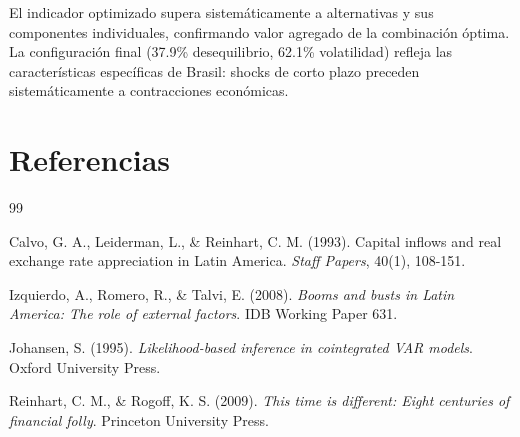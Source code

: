 \documentclass[3p,11pt]{elsarticle}
\begin{document}
El indicador optimizado supera sistemáticamente a alternativas y sus componentes individuales, confirmando valor agregado de la combinación óptima. La configuración final (37.9\% desequilibrio, 62.1\% volatilidad) refleja las características específicas de Brasil: shocks de corto plazo preceden sistemáticamente a contracciones económicas.

\section*{Referencias}

\begin{thebibliography}{99}

Calvo, G. A., Leiderman, L., \& Reinhart, C. M. (1993). Capital inflows and real exchange rate appreciation in Latin America. \textit{Staff Papers}, 40(1), 108-151.

Izquierdo, A., Romero, R., \& Talvi, E. (2008). \textit{Booms and busts in Latin America: The role of external factors}. IDB Working Paper 631.

Johansen, S. (1995). \textit{Likelihood-based inference in cointegrated VAR models}. Oxford University Press.

Reinhart, C. M., \& Rogoff, K. S. (2009). \textit{This time is different: Eight centuries of financial folly}. Princeton University Press.

\end{thebibliography}
\end{document}
